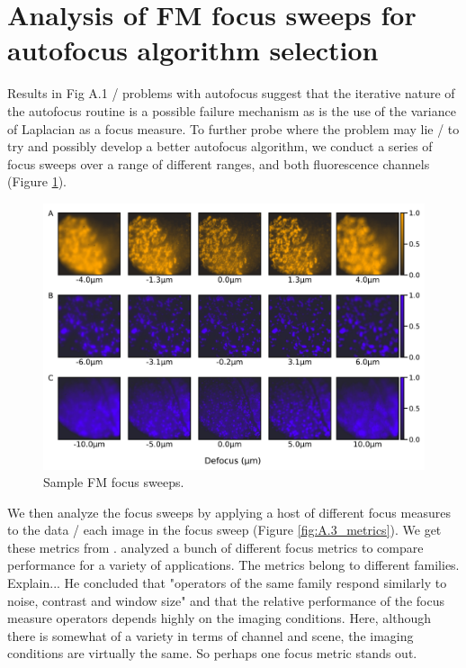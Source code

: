 \section{Analysis of FM focus sweeps for autofocus algorithm selection}

Results in Fig A.1 / problems with autofocus suggest that the iterative nature of the autofocus routine is a possible failure mechanism as is the use of the variance of Laplacian as a focus measure. To further probe where the problem may lie / to try and possibly develop a better autofocus algorithm, we conduct a series of focus sweeps over a range of different ranges, and both fluorescence channels (Figure \ref{fig:A.2_sweeps}).

\begin{figure}[!tbh]
    \centering
    \includegraphics[width=\linewidth]{cppendix-A/figures/fig2_sweeps_v3.pdf}
    \caption{Sample FM focus sweeps.}
    \label{fig:A.2_sweeps}
\end{figure}

We then analyze the focus sweeps by applying a host of different focus measures to the data / each image in the focus sweep (Figure \ref{fig:A.3_metrics}). We get these metrics from \textcite{pertuz2013analysis}. \textcite{pertuz2013analysis} analyzed a bunch of different focus metrics to compare performance for a variety of applications. The metrics belong to different families. Explain... He concluded that "operators of the same family respond similarly to noise, contrast and window size" and that the relative performance of the focus measure operators depends highly on the imaging conditions. Here, although there is somewhat of a variety in terms of channel and scene, the imaging conditions are virtually the same. So perhaps one focus metric stands out.

